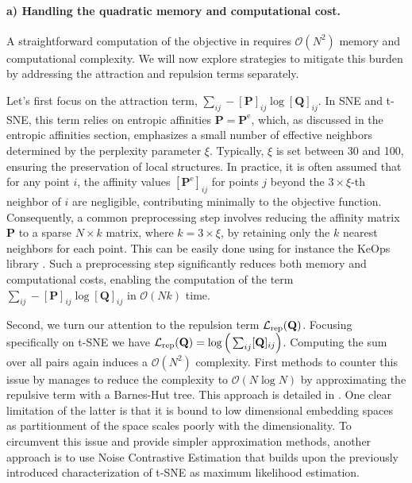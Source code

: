 \paragraph{a) Handling the quadratic memory and computational cost.}
A straightforward computation of the objective in  requires $\mathcal{O}(N^2)$ memory and computational complexity. We will now explore strategies to mitigate this burden by addressing the attraction and repulsion terms separately.

Let's first focus on the attraction term, \(\sum_{ij} -[\mathbf{P}]_{ij} \log [\mathbf{Q}]_{ij}\). In SNE and t-SNE, this term relies on entropic affinities \ie \(\mathbf{P} = \mathbf{P}^{\mathrm{e}}\), which, as discussed in the entropic affinities section, emphasizes a small number of effective neighbors determined by the perplexity parameter \(\xi\). Typically, \(\xi\) is set between 30 and 100, ensuring the preservation of local structures. In practice, it is often assumed that for any point \(i\), the affinity values \([\mathbf{P}^{\mathrm{e}}]_{ij}\) for points \(j\) beyond the \(3 \times \xi\)-th neighbor of \(i\) are negligible, contributing minimally to the objective function. Consequently, a common preprocessing step involves reducing the affinity matrix \(\mathbf{P}\) to a sparse \(N \times k\) matrix, where \(k = 3 \times \xi\), by retaining only the \(k\) nearest neighbors for each point. This can be easily done using for instance the KeOps library \citep{charlier2021kernel}. Such a preprocessing step significantly reduces both memory and computational costs, enabling the computation of the term \(\sum_{ij} -[\mathbf{P}]_{ij} \log [\mathbf{Q}]_{ij}\) in \(\mathcal{O}(Nk)\) time.


Second, we turn our attention to the repulsion term $\mathcal{L}_{\mathrm{rep}}({\mathbf{Q}})$. Focusing specifically on t-SNE we have $\mathcal{L}_{\mathrm{rep}}({\mathbf{Q}}) = \log \Big(\sum_{ij} [{\mathbf{Q}}]_{ij} \Big)$. Computing the sum over all pairs again induces a $\mathcal{O}(N^2)$ complexity. First methods to counter this issue by \cite{van2014accelerating} manages to reduce the complexity to $\mathcal{O}(N \log N)$ by approximating the repulsive term with a Barnes-Hut tree. This approach is detailed in . One clear limitation of the latter is that it is bound to low dimensional embedding spaces as partitionment of the space scales poorly with the dimensionality. To circumvent this issue and provide simpler approximation methods, another approach is to use Noise Contrastive Estimation \citep{gutmann2010noise} that builds upon the previously introduced characterization of t-SNE as maximum likelihood estimation.

